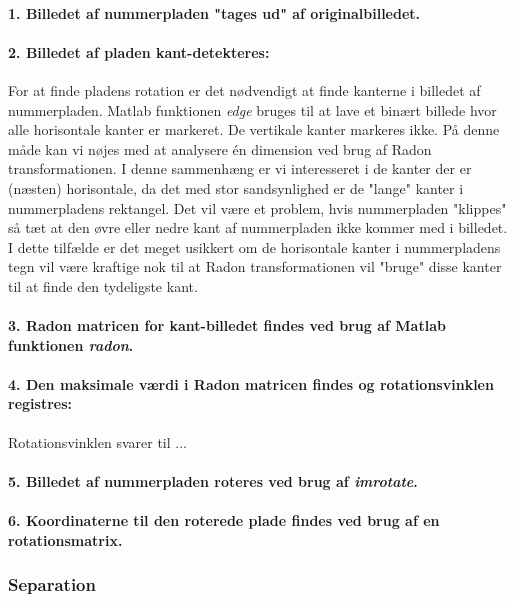 \paragraph{1. Billedet af nummerpladen "tages ud" af originalbilledet.}
\paragraph{2. Billedet af pladen kant-detekteres:}
For at finde pladens rotation er det nødvendigt at finde kanterne i billedet af nummerpladen. Matlab funktionen \textit{edge} bruges til at lave et binært billede hvor alle horisontale kanter er markeret. De vertikale kanter markeres ikke. På denne måde kan vi nøjes med at analysere én dimension ved brug af Radon transformationen. I denne sammenhæng er vi interesseret i de kanter der er (næsten) horisontale, da det med stor sandsynlighed er de "lange" kanter i nummerpladens rektangel. Det vil være et problem, hvis nummerpladen "klippes" så tæt at den øvre eller nedre kant af nummerpladen ikke kommer med i billedet. I dette tilfælde er det meget usikkert om de horisontale kanter i nummerpladens tegn vil være kraftige nok til at Radon transformationen vil "bruge" disse kanter til at finde den tydeligste kant.

\paragraph{3. Radon matricen for kant-billedet findes ved brug af Matlab funktionen \textit{radon}.}

\paragraph{4. Den maksimale værdi i Radon matricen findes og rotationsvinklen registres:}
Rotationsvinklen svarer til ...

\paragraph{5. Billedet af nummerpladen roteres ved brug af \textit{imrotate}.}
\paragraph{6. Koordinaterne til den roterede plade findes ved brug af en rotationsmatrix.}

\subsubsection{Separation}

